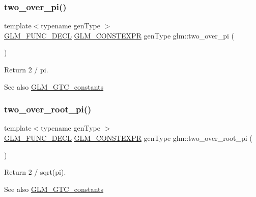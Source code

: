 \subsubsection{\texorpdfstring{two\+\_\+over\+\_\+pi()}{two\_over\_pi()}}
{\footnotesize\ttfamily template$<$typename gen\+Type $>$ \\
\hyperlink{setup_8hpp_ab2d052de21a70539923e9bcbf6e83a51}{G\+L\+M\+\_\+\+F\+U\+N\+C\+\_\+\+D\+E\+CL} \hyperlink{setup_8hpp_a08b807947b47031d3a511f03f89645ad}{G\+L\+M\+\_\+\+C\+O\+N\+S\+T\+E\+X\+PR} gen\+Type glm\+::two\+\_\+over\+\_\+pi (\begin{DoxyParamCaption}{ }\end{DoxyParamCaption})}

Return 2 / pi. \begin{DoxySeeAlso}{See also}
\hyperlink{group__gtc__constants}{G\+L\+M\+\_\+\+G\+T\+C\+\_\+constants} 
\end{DoxySeeAlso}
\mbox{\label{group__gtc__constants_ga5827301817640843cf02026a8d493894}} 
\subsubsection{\texorpdfstring{two\+\_\+over\+\_\+root\+\_\+pi()}{two\_over\_root\_pi()}}
{\footnotesize\ttfamily template$<$typename gen\+Type $>$ \\
\hyperlink{setup_8hpp_ab2d052de21a70539923e9bcbf6e83a51}{G\+L\+M\+\_\+\+F\+U\+N\+C\+\_\+\+D\+E\+CL} \hyperlink{setup_8hpp_a08b807947b47031d3a511f03f89645ad}{G\+L\+M\+\_\+\+C\+O\+N\+S\+T\+E\+X\+PR} gen\+Type glm\+::two\+\_\+over\+\_\+root\+\_\+pi (\begin{DoxyParamCaption}{ }\end{DoxyParamCaption})}

Return 2 / sqrt(pi). \begin{DoxySeeAlso}{See also}
\hyperlink{group__gtc__constants}{G\+L\+M\+\_\+\+G\+T\+C\+\_\+constants} 
\end{DoxySeeAlso}
\mbox{\label{group__gtc__constants_gaa5276a4617566abcfe49286f40e3a256}} 
